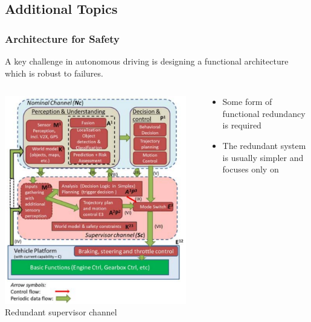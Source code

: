 \subsection{Additional Topics}

\begin{frame}
\frametitle{Architecture for Safety}
A key challenge in autonomous driving is designing a functional architecture
which is robust to failures.

\begin{columns}[T]
    \begin{column}{0.35\textwidth}
        \centering
        \includegraphics[width=0.95\textwidth]{images/redundant_architecture.png}\\
        \vspace{0.2cm}
        \tiny{Redundant supervisor channel \cite{Torngren2018}}
    \end{column}
    \begin{column}{0.65\textwidth}
        \begin{itemize}
            \item Some form of functional redundancy is required
            \item The redundant system is usually simpler and focuses only on

\end{itemize}
\end{column}
\end{columns}
\end{frame}
